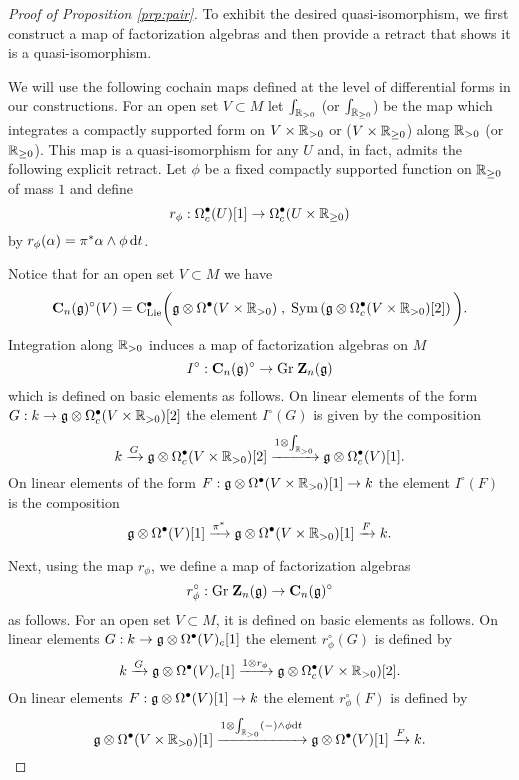 \documentclass[11pt]{amsart}
\numberwithin{equation}{section}
\begin{document}
\begin{proof}[Proof of Proposition \ref{prp:pair}]
To exhibit the desired quasi-isomorphism, 
we first construct a map of factorization algebras and then provide a retract that shows it is a quasi-isomorphism.

We will use the following cochain maps defined at the level of differential forms in our constructions.
For an open set $V \subset M$ let $\int_{\mathbb R_{>0}}$
(or $\int_{\mathbb R_{\geq 0}}$)
be the map which integrates a compactly supported form on $V \times \mathbb R_{> 0}$ or ($V \times \mathbb R_{\geq 0}$) along $\mathbb R_{> 0}$ (or $\mathbb R_{\geq 0}$).
This map is a quasi-isomorphism for any $U$ and, in fact, admits the following explicit retract. 
Let $\phi$ be a fixed compactly supported function on $\mathbb R_{\geq 0}$ of mass $1$ and define
\[
r_\phi : \Omega^\bullet_c(U) [1] \to \Omega^\bullet_c (U \times \mathbb R_{\geq 0})
\]
by $r_\phi (\alpha) = \pi^*\alpha \wedge \phi \, {\rm d} t$. 

Notice that for an open set $V \subset M$ we have 
\[
\mathbf C_n(\mathfrak g)^{\circ} (V) = {\rm C}_{\rm Lie}^\bullet \bigg(\mathfrak g \otimes \Omega^\bullet (V \times \mathbb R_{>0} ) \; , \; {\rm Sym} \left(\mathfrak g \otimes \Omega^\bullet_c(V \times \mathbb R_{>0}) [2] \right) \bigg)  .
\]
Integration along $\mathbb R_{>0}$ induces a map of factorization algebras on $M$
\[
I^{\circ} : \mathbf C_n(\mathfrak g)^\circ \to {\rm Gr} \; \mathbf Z_n (\mathfrak g)
\]
which is defined on basic elements as follows.
On linear elements of the form $G : k \to \mathfrak g \otimes \Omega^\bullet_c (V \times \mathbb R_{>0})[2]$ the element $I^\circ(G)$ is given by the composition
\[
k \xrightarrow{G} \mathfrak g \otimes \Omega^\bullet_c (V \times \mathbb R_{>0})[2] \xrightarrow{1 \otimes \int_{\mathbb R_{> 0}}} \mathfrak g \otimes \Omega^\bullet_c(V) [1] .
\]
On linear elements of the form $F : \mathfrak g \otimes \Omega^\bullet(V \times \mathbb R_{>0})[1] \to k$ the element $I^{\circ} (F)$ is the composition
\[
\mathfrak g \otimes \Omega^\bullet(V) [1] \xrightarrow{\pi^*} \mathfrak g \otimes \Omega^\bullet(V \times \mathbb R_{>0}) [1] \xrightarrow{F} k  .
\]

Next, using the map $r_\phi$, we define a map of factorization algebras
\[
r_\phi^\circ : {\rm Gr} \; \mathbf Z_n (\mathfrak g) \to \mathbf C_n(\mathfrak g)^\circ
\]
as follows. 
For an open set $V \subset M$, it is defined on basic elements as follows.
On linear elements $G : k \to \mathfrak g \otimes \Omega^\bullet(V)_c[1]$ the element $r_\phi^\circ (G)$ is defined by
\[
k \xrightarrow{G} \mathfrak g \otimes \Omega^\bullet(V)_c[1] \xrightarrow{1 \otimes r_\phi} \mathfrak g \otimes \Omega^\bullet_c (V \times \mathbb R_{>0}) [2]  .
\]
On linear elements $F : \mathfrak g \otimes \Omega^\bullet(V)[1] \to k$ the element $r_\phi^\circ (F)$ is defined by
\[
\mathfrak g \otimes \Omega^\bullet (V \times \mathbb R_{>0}) [1] \xrightarrow{1 \otimes \int_{\mathbb R_{>0}} (-) \wedge \phi {\rm d} t} \mathfrak g \otimes \Omega^\bullet(V) [1] \xrightarrow{F} k .
\]


\end{proof}
\end{document}
